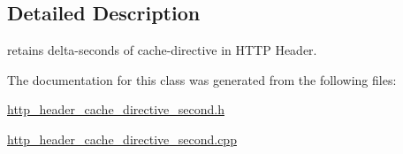 \subsection{Detailed Description}
retains delta-\/seconds of cache-\/directive in H\-T\-T\-P Header. 

The documentation for this class was generated from the following files\-:\begin{DoxyCompactItemize}
\item 
\hyperlink{http__header__cache__directive__second_8h}{http\-\_\-header\-\_\-cache\-\_\-directive\-\_\-second.\-h}\item 
\hyperlink{http__header__cache__directive__second_8cpp}{http\-\_\-header\-\_\-cache\-\_\-directive\-\_\-second.\-cpp}\end{DoxyCompactItemize}
